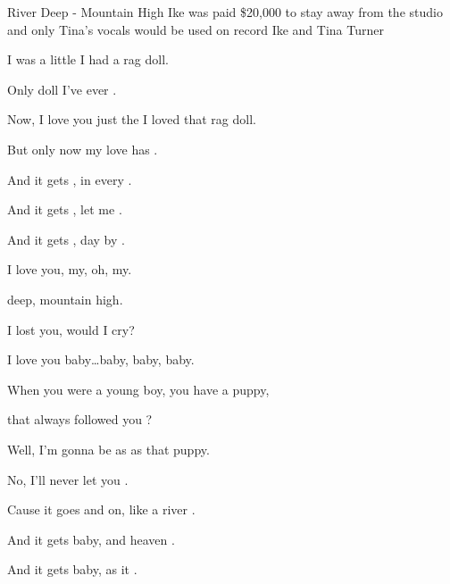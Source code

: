 \begin{SBSong}{River Deep - Mountain High}
  {Ike was paid \$20,000 to stay away from the studio and only Tina's vocals would be used on record}
  {Ike and Tina Turner}
  \begin{SBVerse}
     I was a little  I had a rag doll.

    Only doll I've ever .

    Now, I love you just the  I loved that rag doll.

    But only now my love has .

    And it gets , in every .

    And it gets , let me .
    
    And it gets , day by .
  \end{SBVerse}
  \begin{SBChorus}
     I love you, my, oh, my.

     deep, mountain high.

     I lost you, would I cry?

     I love you baby\ldots baby, baby, baby. 
  \end{SBChorus}
  \begin{SBVerse}
    When you were a young boy,  you have a puppy,

    that always followed you ?

    Well, I'm gonna be as  as that puppy.

    No, I'll never let you .

    Cause it goes  and on, like a river .

    And it gets  baby, and heaven .

    And it gets  baby, as it .
  \end{SBVerse}
\end{SBSong}